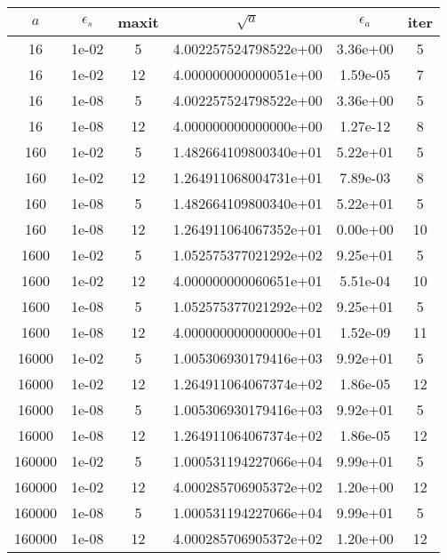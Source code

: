 
\begin{tabular}{|ccc|ccc|}\hline 
$a$ & $\epsilon_s$ & maxit & $\sqrt{a}$ & $\epsilon_a$ & iter\\ \hline 
      16 &    1e-02 &        5 & 4.002257524798522e+00 & 3.36e+00 &        5 \\
      16 &    1e-02 &       12 & 4.000000000000051e+00 & 1.59e-05 &        7 \\
      16 &    1e-08 &        5 & 4.002257524798522e+00 & 3.36e+00 &        5 \\
      16 &    1e-08 &       12 & 4.000000000000000e+00 & 1.27e-12 &        8 \\\hline 
     160 &    1e-02 &        5 & 1.482664109800340e+01 & 5.22e+01 &        5 \\
     160 &    1e-02 &       12 & 1.264911068004731e+01 & 7.89e-03 &        8 \\
     160 &    1e-08 &        5 & 1.482664109800340e+01 & 5.22e+01 &        5 \\
     160 &    1e-08 &       12 & 1.264911064067352e+01 & 0.00e+00 &       10 \\\hline 
    1600 &    1e-02 &        5 & 1.052575377021292e+02 & 9.25e+01 &        5 \\
    1600 &    1e-02 &       12 & 4.000000000060651e+01 & 5.51e-04 &       10 \\
    1600 &    1e-08 &        5 & 1.052575377021292e+02 & 9.25e+01 &        5 \\
    1600 &    1e-08 &       12 & 4.000000000000000e+01 & 1.52e-09 &       11 \\\hline 
   16000 &    1e-02 &        5 & 1.005306930179416e+03 & 9.92e+01 &        5 \\
   16000 &    1e-02 &       12 & 1.264911064067374e+02 & 1.86e-05 &       12 \\
   16000 &    1e-08 &        5 & 1.005306930179416e+03 & 9.92e+01 &        5 \\
   16000 &    1e-08 &       12 & 1.264911064067374e+02 & 1.86e-05 &       12 \\\hline 
  160000 &    1e-02 &        5 & 1.000531194227066e+04 & 9.99e+01 &        5 \\
  160000 &    1e-02 &       12 & 4.000285706905372e+02 & 1.20e+00 &       12 \\
  160000 &    1e-08 &        5 & 1.000531194227066e+04 & 9.99e+01 &        5 \\
  160000 &    1e-08 &       12 & 4.000285706905372e+02 & 1.20e+00 &       12 \\\hline 
\end{tabular}
